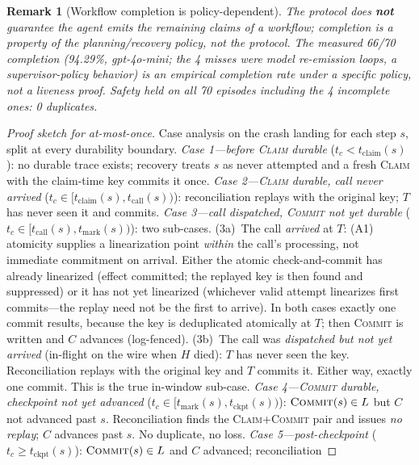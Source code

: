 \documentclass[10pt,journal,compsoc]{IEEEtran}
\newtheorem{remark}{Remark}
\begin{document}
\begin{remark}[Workflow completion is policy-dependent]
The protocol does \textbf{not} guarantee the agent emits the
remaining claims of a workflow; completion is a property of the
planning/recovery policy, not the protocol. The measured 66/70
completion (94.29\%, gpt-4o-mini; the 4 misses were model
re-emission loops, a supervisor-policy behavior) is an empirical
completion rate under a specific policy, not a liveness proof.
Safety held on all 70 episodes including the 4 incomplete ones:
0 duplicates.
\end{remark}

\begin{proof}[Proof sketch for at-most-once]
Case analysis on the crash landing for each step $s$, split at
every durability boundary. \emph{Case 1---before
\textsc{Claim} durable} ($t_c < t_{\mathrm{claim}}(s)$): no
durable trace exists; recovery treats $s$ as never attempted and
a fresh \textsc{Claim} with the claim-time key commits it once.
\emph{Case 2---\textsc{Claim} durable, call never arrived}
($t_c \in [t_{\mathrm{claim}}(s), t_{\mathrm{call}}(s))$):
reconciliation replays with the original key; $T$ has never seen
it and commits. \emph{Case 3---call dispatched, \textsc{Commit} not yet durable}
($t_c \in [t_{\mathrm{call}}(s), t_{\mathrm{mark}}(s))$): two
sub-cases. (3a)~The call \emph{arrived} at $T$: (A1)
atomicity supplies a linearization point \emph{within} the
call's processing, not immediate commitment on arrival. Either
the atomic check-and-commit has already linearized (effect
committed; the replayed key is then found and suppressed) or it
has not yet linearized (whichever valid attempt linearizes
first commits---the replay need not be the first to arrive). In both cases exactly one commit results, because
the key is deduplicated atomically at $T$; then
\textsc{Commit} is written and $C$ advances (log-fenced).
(3b)~The call was \emph{dispatched but not yet arrived}
(in-flight on the wire when $H$ died): $T$ has never seen the
key. Reconciliation replays with the original key and $T$
commits it. Either way, exactly one commit. This is the true
in-window sub-case.
\emph{Case 4---\textsc{Commit} durable, checkpoint not yet
advanced} ($t_c \in [t_{\mathrm{mark}}(s),
t_{\mathrm{ckpt}}(s))$): $\textsc{Commit}(s) \in L$ but $C$ not
advanced past $s$. Reconciliation finds the
\textsc{Claim}+\textsc{Commit} pair and issues \emph{no replay};
$C$ advances past $s$. No duplicate, no loss.
\emph{Case 5---post-checkpoint} ($t_c \ge t_{\mathrm{ckpt}}(s)$):
$\textsc{Commit}(s) \in L$ and $C$ advanced; reconciliation

\end{proof}
\end{document}
